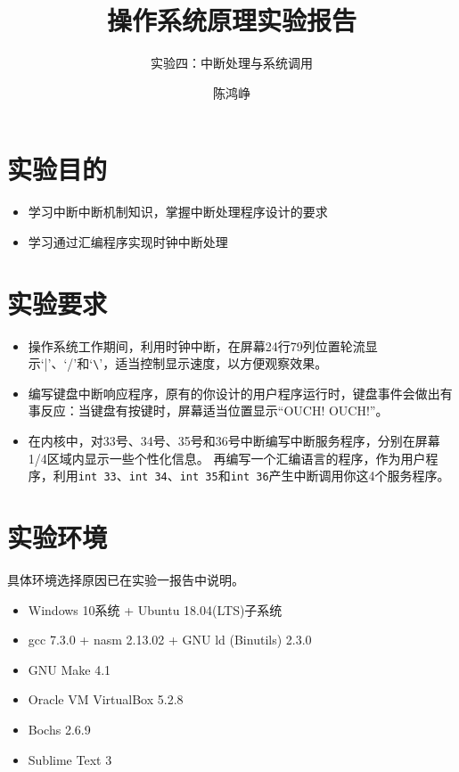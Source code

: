 \documentclass[logo,reportComp]{thesis}
\title{操作系统原理实验报告}
\subtitle{实验四：中断处理与系统调用}
\author{陈鸿峥}
\begin{document}
\maketitle

\section{实验目的}
\begin{itemize}
	\item 学习中断中断机制知识，掌握中断处理程序设计的要求
	\item 学习通过汇编程序实现时钟中断处理
\end{itemize}

\section{实验要求}
\begin{itemize}
	\item %
	操作系统工作期间，利用时钟中断，在屏幕24行79列位置轮流显示`|'、`/'和`\verb'\''，适当控制显示速度，以方便观察效果。
	\item 编写键盘中断响应程序，原有的你设计的用户程序运行时，键盘事件会做出有事反应：当键盘有按键时，屏幕适当位置显示``OUCH! OUCH!''。
	\item 在内核中，对33号、34号、35号和36号中断编写中断服务程序，分别在屏幕1/4区域内显示一些个性化信息。
	再编写一个汇编语言的程序，作为用户程序，利用\verb'int 33'、\verb'int 34'、\verb'int 35'和\verb'int 36'产生中断调用你这4个服务程序。
\end{itemize}

\section{实验环境}
具体环境选择原因已在实验一报告中说明。
\begin{itemize}
	\item Windows 10系统 + Ubuntu 18.04(LTS)子系统
	\item gcc 7.3.0 + nasm 2.13.02 + GNU ld (Binutils) 2.3.0
    \item GNU Make 4.1
	\item Oracle VM VirtualBox 5.2.8
    \item Bochs 2.6.9
	\item Sublime Text 3
\end{itemize}
\end{document}
